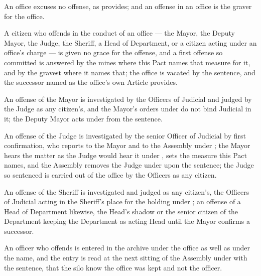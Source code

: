 An office excuses no offense, as  provides; and an offense in an office is the graver for the office.

\begin{clauses}
\item A citizen who offends in the conduct of an office --- the Mayor, the Deputy Mayor, the Judge, the Sheriff, a Head of Department, or a citizen acting under an office's charge --- is given no grace for the offense, and a first offense so committed is answered by the mines where this Pact names that measure for it, and by the gravest where it names that; the office is vacated by the sentence, and the successor named as the office's own Article provides.
\item An offense of the Mayor is investigated by the Officers of Judicial and judged by the Judge as any citizen's, and the Mayor's orders under  do not bind Judicial in it; the Deputy Mayor acts under  from the sentence.
\item An offense of the Judge is investigated by the senior Officer of Judicial by first confirmation, who reports to the Mayor and to the Assembly under ; the Mayor hears the matter as the Judge would hear it under , sets the measure this Pact names, and the Assembly removes the Judge under  upon the sentence; the Judge so sentenced is carried out of the office by the Officers as any citizen.
\item An offense of the Sheriff is investigated and judged as any citizen's, the Officers of Judicial acting in the Sheriff's place for the holding under ; an offense of a Head of Department likewise, the Head's shadow or the senior citizen of the Department keeping the Department as acting Head until the Mayor confirms a successor.
\item An officer who offends is entered in the archive under the office as well as under the name, and the entry is read at the next sitting of the Assembly under  with the sentence, that the silo know the office was kept and not the officer.
\end{clauses}
